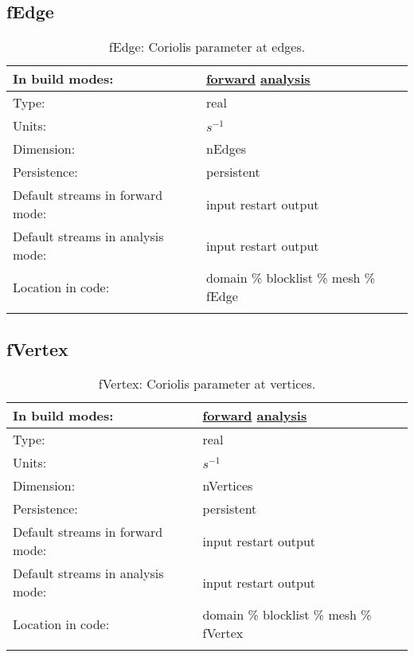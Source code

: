 \subsection[fEdge]{fEdge}
\label{subsec:var_sec_mesh_fEdge}
\begin{center}
\begin{longtable}{| p{2.0in} | p{4.0in} |}
        \hline 
        In build modes: & \hyperref[subsec:forward_var_tab_mesh]{forward} \hyperref[subsec:analysis_var_tab_mesh]{analysis} \\
        \hline 
        Type: & real \\
        \hline 
        Units: & $s^{-1}$ \\
        \hline 
        Dimension: & nEdges \\
        \hline 
        Persistence: & persistent \\
        \hline 
		 Default streams in forward mode: &  input restart output \\
        \hline 
		 Default streams in analysis mode: &  input restart output \\
        \hline 
		 Location in code: & domain \% blocklist \% mesh \% fEdge \\
		 \hline 
    \caption{fEdge: Coriolis parameter at edges.}
\end{longtable}
\end{center}
\subsection[fVertex]{fVertex}
\label{subsec:var_sec_mesh_fVertex}
\begin{center}
\begin{longtable}{| p{2.0in} | p{4.0in} |}
        \hline 
        In build modes: & \hyperref[subsec:forward_var_tab_mesh]{forward} \hyperref[subsec:analysis_var_tab_mesh]{analysis} \\
        \hline 
        Type: & real \\
        \hline 
        Units: & $s^{-1}$ \\
        \hline 
        Dimension: & nVertices \\
        \hline 
        Persistence: & persistent \\
        \hline 
		 Default streams in forward mode: &  input restart output \\
        \hline 
		 Default streams in analysis mode: &  input restart output \\
        \hline 
		 Location in code: & domain \% blocklist \% mesh \% fVertex \\
		 \hline 
    \caption{fVertex: Coriolis parameter at vertices.}
\end{longtable}
\end{center}
